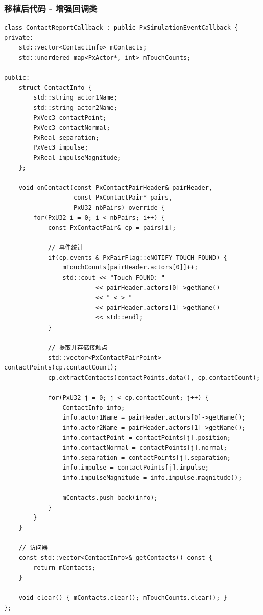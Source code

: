 \subsubsection{移植后代码 - 增强回调类}
\begin{lstlisting}[caption={移植后ContactReportCallback实现}]
class ContactReportCallback : public PxSimulationEventCallback {
private:
    std::vector<ContactInfo> mContacts;
    std::unordered_map<PxActor*, int> mTouchCounts;

public:
    struct ContactInfo {
        std::string actor1Name;
        std::string actor2Name;
        PxVec3 contactPoint;
        PxVec3 contactNormal;
        PxReal separation;
        PxVec3 impulse;
        PxReal impulseMagnitude;
    };

    void onContact(const PxContactPairHeader& pairHeader,
                   const PxContactPair* pairs,
                   PxU32 nbPairs) override {
        for(PxU32 i = 0; i < nbPairs; i++) {
            const PxContactPair& cp = pairs[i];

            // 事件统计
            if(cp.events & PxPairFlag::eNOTIFY_TOUCH_FOUND) {
                mTouchCounts[pairHeader.actors[0]]++;
                std::cout << "Touch FOUND: "
                         << pairHeader.actors[0]->getName()
                         << " <-> "
                         << pairHeader.actors[1]->getName()
                         << std::endl;
            }

            // 提取并存储接触点
            std::vector<PxContactPairPoint> contactPoints(cp.contactCount);
            cp.extractContacts(contactPoints.data(), cp.contactCount);

            for(PxU32 j = 0; j < cp.contactCount; j++) {
                ContactInfo info;
                info.actor1Name = pairHeader.actors[0]->getName();
                info.actor2Name = pairHeader.actors[1]->getName();
                info.contactPoint = contactPoints[j].position;
                info.contactNormal = contactPoints[j].normal;
                info.separation = contactPoints[j].separation;
                info.impulse = contactPoints[j].impulse;
                info.impulseMagnitude = info.impulse.magnitude();

                mContacts.push_back(info);
            }
        }
    }

    // 访问器
    const std::vector<ContactInfo>& getContacts() const {
        return mContacts;
    }

    void clear() { mContacts.clear(); mTouchCounts.clear(); }
};
\end{lstlisting}

